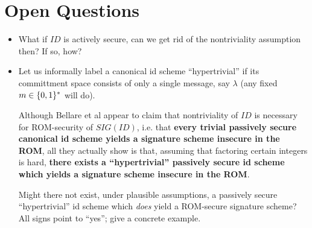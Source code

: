 \documentclass[12pt,twoside]{article}
\begin{document}
\section{Open Questions}
\begin{itemize}
\item What if $ID$ is actively secure, can we get rid of the nontriviality
assumption then? If so, how?

\item 

Let us informally label a canonical id scheme ``hypertrivial'' if its
committment space consists of
only a single message, say $\lambda$ (any fixed $m \in \{0,1\}^{*}$ will do). 

Although Bellare et al appear to claim that nontriviality of $ID$ is
necessary for ROM-security of $SIG(ID)$, i.e. that {\bf every trivial passively 
secure canonical id scheme yields a signature scheme insecure in the ROM}, all they 
actually show is that, assuming that factoring certain integers is hard, 
{\bf there exists a ``hypertrivial'' passively secure id scheme which yields a 
signature scheme insecure in the ROM}. 

Might there not exist, under plausible assumptions, a passively secure 
``hypertrivial'' id scheme which {\it does} yield a ROM-secure signature 
scheme? All signs point to ``yes''; give a concrete example.  

\end{itemize}



\end{document}
